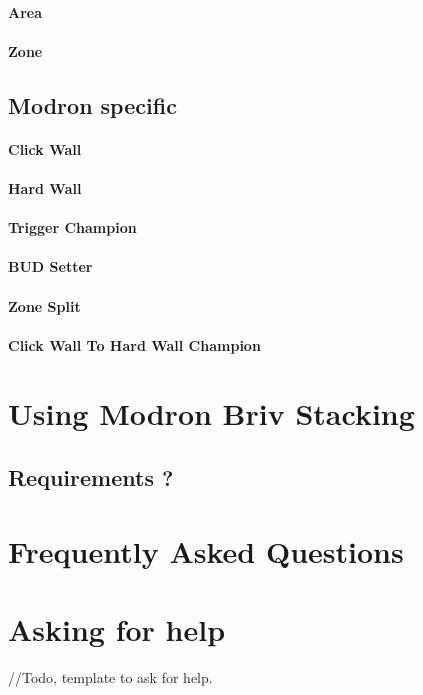 \documentclass{article}
\begin{document}
\paragraph{Area}

\paragraph{Zone}

\subsection{Modron specific}

\paragraph{Click Wall}

\paragraph{Hard Wall}

\paragraph{Trigger Champion}

\paragraph{BUD Setter}

\paragraph{Zone Split}

\paragraph{Click Wall To Hard Wall Champion}


\section{Using Modron Briv Stacking}

\subsection{Requirements ?} 

\section{Frequently Asked Questions}


\section{Asking for help}
//Todo, template to ask for help.
\end{document}
